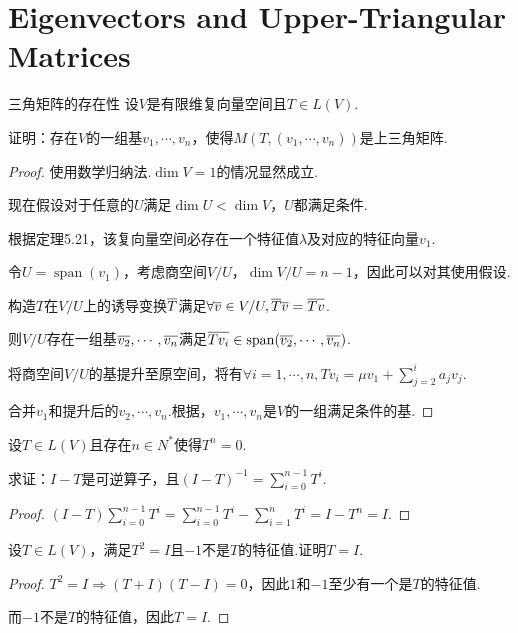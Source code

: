 \section{Eigenvectors and Upper-Triangular Matrices}

\begin{theorem}[5.27]\label{thm 5.27} 三角矩阵的存在性 \:
    设\(V\)是有限维复向量空间且\(T \in L(V)\).

    证明：存在\(V\)的一组基\(v_1,\cdots,v_n\)，使得\(M(T,(v_1,\cdots,v_n))\)是上三角矩阵.
\end{theorem}

\begin{proof}
    使用数学归纳法.\(\dim V=1\)的情况显然成立.

    现在假设对于任意的\(U\)满足\(\dim U<\dim V\)，\(U\)都满足条件.
    
    根据定理5.21，该复向量空间必存在一个特征值\(\lambda\)及对应的特征向量\(v_1\).
    
    令\(U=\operatorname{span}(v_1)\)，考虑商空间\(V/U\)，\(\dim V/U=n-1\)，因此可以对其使用假设.
    
    构造\(T\)在\(V/U\)上的诱导变换\(\overline{T}\)满足\(\forall \overline{v} \in V/U,\overline{T}\overline{v}=\overline{Tv}\).
    
    则\(V/U\)存在一组基\(\overline{v_2},\cdots,\overline{v_n}\)满足\(\overline{Tv_i} \in \operatorname{span}(\overline{v_2},\cdots,\overline{v_n})\).
    
    将商空间\(V/U\)的基提升至原空间，将有\(\forall i=1,\cdots,n,Tv_i=\mu v_1+\sum_{j=2}^i a_jv_j\).
    
    合并\(v_1\)和提升后的\(v_2,\cdots,v_n\).根据，\(v_1,\cdots,v_n\)是\(V\)的一组满足条件的基.
\end{proof}

\begin{problem}[1]\label{5.B.1}
    设\(T \in L(V)\)且存在\(n \in N^*\)使得\(T^n=0\).
    
    求证：\(I-T\)是可逆算子，且\((I-T)^{-1}=\sum_{i=0}^{n-1} T^i\).
\end{problem}

\begin{proof}
    \((I-T)\sum_{i=0}^{n-1} T^i=\sum_{i=0}^{n-1} T^i-\sum_{i=1}^n T^i=I-T^n=I\).
\end{proof}

\begin{problem}[3]
    设\(T \in L(V)\)，满足\(T^2=I\)且\(-1\)不是\(T\)的特征值.证明\(T=I\).
\end{problem}

\begin{proof}
    \(T^2=I \Rightarrow (T+I)(T-I)=0\)，因此\(1\)和\(-1\)至少有一个是\(T\)的特征值.

    而\(-1\)不是\(T\)的特征值，因此\(T=I\).
\end{proof}

